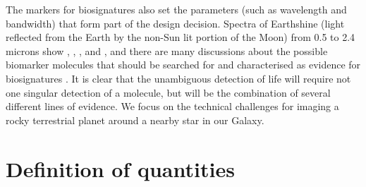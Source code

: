 \documentclass[letterpaper]{ar-1col}
\begin{document}
The markers for biosignatures also set the parameters (such as wavelength and bandwidth) that form part of the design decision.
%
Spectra of Earthshine (light reflected from the Earth by the non-Sun lit portion of the Moon) from 0.5 to 2.4 microns show , , ,  and  \citep{Turnbull06}, and there are many discussions about the possible biomarker molecules that should be searched for and characterised as evidence for biosignatures \citep[see the reviews of ][]{2016AsBio..16..465S,2017ARAA..55..433K,2018AsBio..18..663S}.
%
It is clear that the unambiguous detection of life will require not one singular detection of a molecule, but will be the combination of several different lines of evidence.
%
We focus on the technical challenges for imaging a rocky terrestrial planet around a nearby star in our Galaxy.

\section{Definition of quantities}






\end{document}
